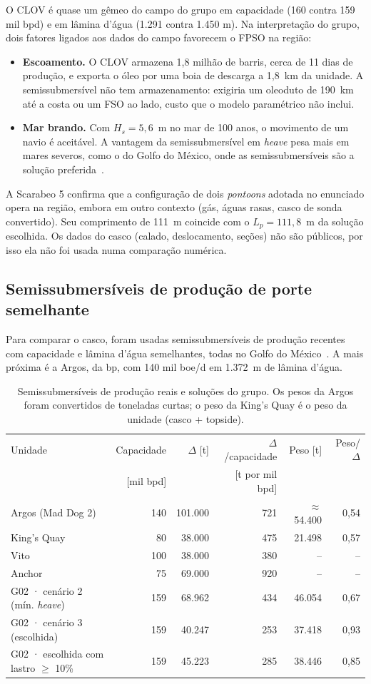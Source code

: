\documentclass[11pt,a4paper]{article}
\begin{document}
O CLOV é quase um gêmeo do campo do grupo em capacidade (160 contra 159 mil bpd) e em lâmina
d'água (1.291 contra 1.450 m). Na interpretação do grupo, dois fatores ligados aos dados do campo
favorecem o FPSO na região:
\begin{itemize}
\item \textbf{Escoamento.} O CLOV armazena 1,8 milhão de barris, cerca de 11 dias de produção,
e exporta o óleo por uma boia de descarga a 1,8~km da unidade. A semissubmersível não tem armazenamento: exigiria um oleoduto de 190~km até a
costa ou um FSO ao lado, custo que o modelo paramétrico não inclui.
\item \textbf{Mar brando.} Com $H_s = 5{,}6$~m no mar de 100 anos, o movimento de um navio é
aceitável. A vantagem da semissubmersível em \emph{heave} pesa mais em mares severos, como o
do Golfo do México, onde as semissubmersíveis são a solução preferida~\cite{omsemis}.
\end{itemize}
A Scarabeo 5 confirma que a configuração de dois \emph{pontoons} adotada no enunciado opera na
região, embora em outro contexto (gás, águas rasas, casco de sonda convertido). Seu comprimento
de 111~m coincide com o $L_p = 111{,}8$~m da solução escolhida. Os dados do casco (calado,
deslocamento, seções) não são públicos, por isso ela não foi usada numa comparação numérica.

\subsection{Semissubmersíveis de produção de porte semelhante}

Para comparar o casco, foram usadas semissubmersíveis de produção recentes com capacidade e lâmina
d'água semelhantes, todas no Golfo do México~\cite{omsemis,omgom}. A mais próxima é a Argos, da bp,
com 140 mil boe/d em 1.372~m de lâmina d'água.

\begin{table}[H]
\centering
\caption{Semissubmersíveis de produção reais e soluções do grupo. Os pesos da Argos foram
convertidos de toneladas curtas; o peso da King's Quay é o peso da unidade (casco + topside).}\label{tab:reaissemi}
\small
\begin{tabular}{lrrrrr}
\toprule
Unidade & Capacidade & $\Delta$ [t] & $\Delta$/capacidade & Peso [t] & Peso/$\Delta$ \\
 & [mil bpd] & & [t por mil bpd] & & \\
\midrule
Argos (Mad Dog 2) & 140 & 101.000 & 721 & $\approx$ 54.400 & 0,54 \\
King's Quay & 80 & 38.000 & 475 & 21.498 & 0,57 \\
Vito & 100 & 38.000 & 380 & -- & -- \\
Anchor & 75 & 69.000 & 920 & -- & -- \\
\midrule
G02 · cenário 2 (mín. \emph{heave}) & 159 & 68.962 & 434 & 46.054 & 0,67 \\
G02 · cenário 3 (escolhida) & 159 & 40.247 & 253 & 37.418 & 0,93 \\
G02 · escolhida com lastro $\ge$ 10\% & 159 & 45.223 & 285 & 38.446 & 0,85 \\
\bottomrule
\end{tabular}
\end{table}
\end{document}
